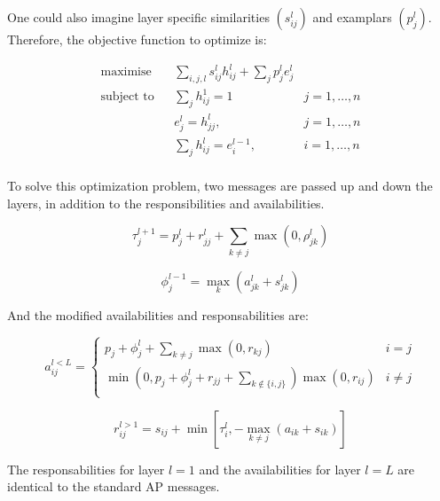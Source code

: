\documentclass{ipol}
\begin{document}
One could also imagine layer specific similarities $(s^l_{ij})$ and examplars
$(p^l_j)$. Therefore, the objective function to optimize is:

\begin{equation*}
\renewcommand{\arraystretch}{2}
\begin{array}{ccll}
\text{maximise} & & \sum_{i, j, l} s^l_{ij} h^l_{ij} + \sum_{j} p^l_j e^l_j \\
\text{subject to} &  & \sum_{j} h_{ij}^1 = 1 & j = 1, \dots, n\\
		  &  & e^l_{j} = h^l_{jj}, & j = 1, \dots, n\\
		  &  & \sum_{j} h_{ij}^l = e_i^{l-1}, & i = 1, \dots, n\\

\end{array}
\end{equation*}

To solve this optimization problem, two messages are passed up and down the
layers, in addition to the responsibilities and availabilities.

\begin{equation}
\tau_j^{l + 1} = p^l_j + r_{jj}^l + \sum_{k \neq j} \max (0, \rho^l_{jk})
\end{equation}

\begin{equation}
\phi_j^{l - 1} = \max_k (a_{jk}^l + s_{jk}^l)
\end{equation}

And the modified availabilities and responsabilities are:

\begin{equation}
a_{ij}^{l < L} = \begin{cases}
	    p_j + \phi_j^l + \sum_{k \neq j} \max(0, r_{kj}) &  i = j \\
	    \min ( 0, p_j + \phi_j^l + r_{jj} + \sum_{k \notin \{i, j\} } ) \max (0, r_{ij}) & i \neq j\\
	 \end{cases}
\end{equation}

\begin{equation*}
r_{ij}^{l > 1} = s_{ij}  + \min [ \tau_i^l, - \max_{k \neq j} (a_{ik} + s_{ik}) ]
\end{equation*}

The responsabilities for layer $l = 1$ and the availabilities for layer $l =
L$ are identical to the standard AP messages. \\
\end{document}
